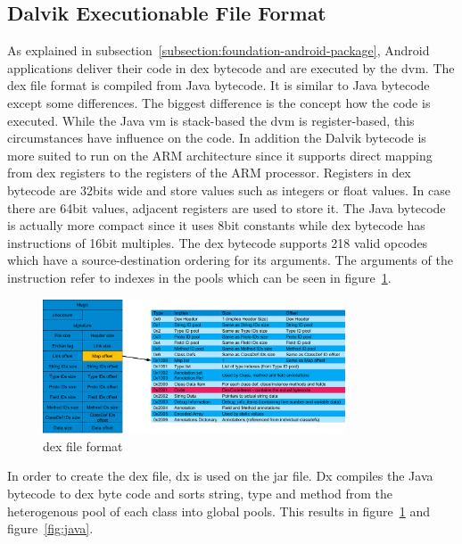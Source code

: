 \subsection{Dalvik Executionable File Format} \label{subsection:android-dex}
As explained in subsection~\ref{subsection:foundation-android-package}, Android applications deliver their code in \gls{dex} bytecode and are executed by the \gls{dvm}.
The dex file format is compiled from Java bytecode. It is similar to Java bytecode except some differences.
The biggest difference is the concept how the code is executed.
While the Java \gls{vm} is stack-based the \gls{dvm} is register-based, this circumstances have influence on the code.
In addition the Dalvik bytecode is more suited to run on the ARM architecture since it supports direct mapping from dex registers to the registers of the ARM processor.
Registers in \gls{dex} bytecode are 32bits wide and store values such as integers or float values.
In case there are 64bit values, adjacent registers are used to store it.
The Java bytecode is actually more compact since it uses 8bit constants while \gls{dex} bytecode has instructions of 16bit multiples.
The \gls{dex} bytecode supports 218 valid opcodes which have a source-destination ordering for its arguments.
The arguments of the instruction refer to indexes in the pools which can be seen in figure~\ref{fig:dex}.
\newline
\begin{figure}[h]
    \centering
    \includegraphics[width=0.8\textwidth]{data/dex.png}
    \caption{\gls{dex} file format \cite{andevconDalvikART}}
    \label{fig:dex}
\end{figure}

In order to create the dex file, dx is used on the \gls{jar} file.
Dx compiles the Java bytecode to \gls{dex} byte code and sorts string, type and method from the heterogenous pool of each class into global pools.
This results in figure~\ref{fig:dex} and figure~\ref{fig:java}.

